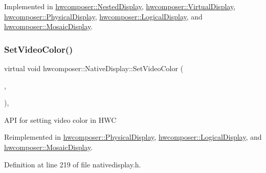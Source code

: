 Implemented in \mbox{\hyperlink{classhwcomposer_1_1NestedDisplay_a4cab919931af541339c97f3b2d8b032d}{hwcomposer\+::\+Nested\+Display}}, \mbox{\hyperlink{classhwcomposer_1_1VirtualDisplay_a303aab0dcc612e932690885d1b88d985}{hwcomposer\+::\+Virtual\+Display}}, \mbox{\hyperlink{classhwcomposer_1_1PhysicalDisplay_a4fc0fbe6c307de00cd10a3c998c74b51}{hwcomposer\+::\+Physical\+Display}}, \mbox{\hyperlink{classhwcomposer_1_1LogicalDisplay_aed95336a0e93791e9e97b5e1c0940a7e}{hwcomposer\+::\+Logical\+Display}}, and \mbox{\hyperlink{classhwcomposer_1_1MosaicDisplay_a001b4f2775a2a50d380ff6eb33ba3683}{hwcomposer\+::\+Mosaic\+Display}}.

\mbox{\label{classhwcomposer_1_1NativeDisplay_a373e7c998f9d2767bafedc918c4001bc}} 
\subsubsection{\texorpdfstring{Set\+Video\+Color()}{SetVideoColor()}}
{\footnotesize\ttfamily virtual void hwcomposer\+::\+Native\+Display\+::\+Set\+Video\+Color (\begin{DoxyParamCaption}\item[{H\+W\+C\+Color\+Control}]{,  }\item[{float}]{ }\end{DoxyParamCaption})\hspace{0.3cm}{\ttfamily [inline]}, {\ttfamily [virtual]}}

A\+PI for setting video color in H\+WC 

Reimplemented in \mbox{\hyperlink{classhwcomposer_1_1PhysicalDisplay_a7a58ed7399533404438fbed2682fdd54}{hwcomposer\+::\+Physical\+Display}}, \mbox{\hyperlink{classhwcomposer_1_1LogicalDisplay_af963f6dd39bb6d7f043b6908ea5c64e5}{hwcomposer\+::\+Logical\+Display}}, and \mbox{\hyperlink{classhwcomposer_1_1MosaicDisplay_adba98086d56d0ccc2df7a57a87ddd4b0}{hwcomposer\+::\+Mosaic\+Display}}.



Definition at line 219 of file nativedisplay.\+h.


\begin{DoxyCode}{0}
\end{DoxyCode}
\mbox{\label{classhwcomposer_1_1NativeDisplay_ae0c6d8eebaae9cdacd1e4bfba84585bf}} 
